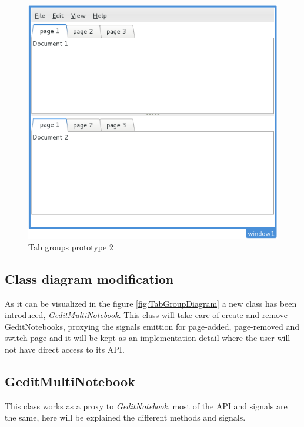 \begin{figure}[H]
\begin{minipage}[b]{0.5\linewidth}
    \includegraphics[scale=0.40]{./images/tab-groups-proto-2}
    \caption{Tab groups prototype 2}\label{fig:TabGroupsProto2}
  \end{minipage}
\end{figure}

\newpage
\subsection{Class diagram modification}


As it can be visualized in the figure \ref{fig:TabGroupDiagram} a new class has been introduced, \emph{GeditMultiNotebook}. This class will take care of create and remove GeditNotebooks, proxying the signals emittion for page-added, page-removed and switch-page and it will be kept as an implementation detail where the user will not have direct access to its API.

\newpage
\subsection{GeditMultiNotebook}

This class works as a proxy to \emph{GeditNotebook}, most of the API and signals are the same, here will be explained the different methods and signals.

